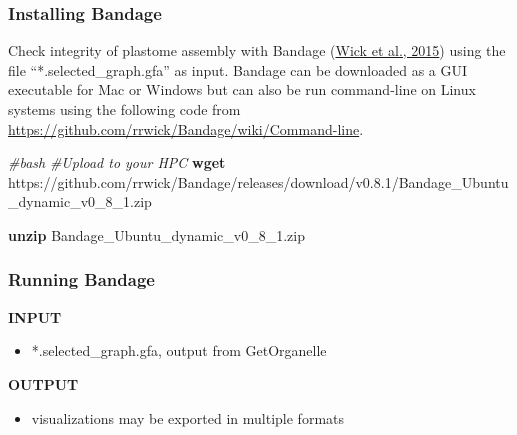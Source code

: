 \documentclass[
  12pt,
]{article}
\newenvironment{Shaded}{\begin{snugshade}}{\end{snugshade}}
\newcommand{\CommentTok}[1]{\textcolor[rgb]{0.56,0.35,0.01}{\textit{#1}}}
\newcommand{\ControlFlowTok}[1]{\textcolor[rgb]{0.13,0.29,0.53}{\textbf{#1}}}
\newcommand{\ExtensionTok}[1]{#1}
\newcommand{\FunctionTok}[1]{\textcolor[rgb]{0.13,0.29,0.53}{\textbf{#1}}}
\newcommand{\KeywordTok}[1]{\textcolor[rgb]{0.13,0.29,0.53}{\textbf{#1}}}
\newcommand{\NormalTok}[1]{#1}
\newcommand{\PreprocessorTok}[1]{\textcolor[rgb]{0.56,0.35,0.01}{\textit{#1}}}
\newcommand{\VariableTok}[1]{\textcolor[rgb]{0.00,0.00,0.00}{#1}}
\providecommand{\tightlist}{%
  \setlength{\itemsep}{0pt}\setlength{\parskip}{0pt}}
\begin{document}
\hypertarget{installing-bandage}{%
\subsubsection{Installing Bandage}\label{installing-bandage}}

Check integrity of plastome assembly with Bandage (\protect\hyperlink{ref-Wick2015}{Wick et al., 2015}) using the file ``*.selected\_graph.gfa'' as input. Bandage can be downloaded as a GUI executable for Mac or Windows but can also be run command-line on Linux systems using the following code from \url{https://github.com/rrwick/Bandage/wiki/Command-line}.

\begin{Shaded}
\begin{Highlighting}[]
\CommentTok{\#bash}
\CommentTok{\#Upload to your HPC}
\FunctionTok{wget}\NormalTok{ https://github.com/rrwick/Bandage/releases/download/v0.8.1/Bandage\_Ubuntu\_dynamic\_v0\_8\_1.zip}

\FunctionTok{unzip}\NormalTok{ Bandage\_Ubuntu\_dynamic\_v0\_8\_1.zip}
\end{Highlighting}
\end{Shaded}

\hypertarget{running-bandage}{%
\subsubsection{Running Bandage}\label{running-bandage}}

\textbf{INPUT}

\begin{itemize}
\tightlist
\item
  *.selected\_graph.gfa, output from GetOrganelle
\end{itemize}

\begin{Shaded}
\end{Shaded}

\textbf{OUTPUT}

\begin{itemize}
\tightlist
\item
  visualizations may be exported in multiple formats
\end{itemize}
\end{document}
